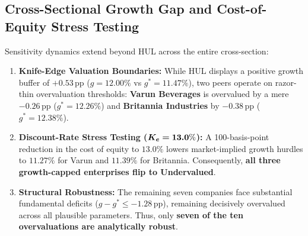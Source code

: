 \subsection{Cross-Sectional Growth Gap and Cost-of-Equity Stress Testing}
Sensitivity dynamics extend beyond HUL across the entire cross-section:
\begin{enumerate}[label=\textbf{\arabic*.}, topsep=2pt, itemsep=1.5pt, parsep=0pt]
    \item \textbf{Knife-Edge Valuation Boundaries:} While HUL displays a positive growth buffer of \textbf{$+0.53\,\text{pp}$} ($g = 12.00\%$ vs $g^* = 11.47\%$), two peers operate on razor-thin overvaluation thresholds: \textbf{Varun Beverages} is overvalued by a mere \textbf{$-0.26\,\text{pp}$} ($g^* = 12.26\%$) and \textbf{Britannia Industries} by \textbf{$-0.38\,\text{pp}$} ($g^* = 12.38\%$).
    \item \textbf{Discount-Rate Stress Testing ($\bm{K_e = 13.0\%}$):} A 100-basis-point reduction in the cost of equity to $13.0\%$ lowers market-implied growth hurdles to $11.27\%$ for Varun and $11.39\%$ for Britannia. Consequently, \textbf{all three growth-capped enterprises flip to Undervalued}.
    \item \textbf{Structural Robustness:} The remaining seven companies face substantial fundamental deficits ($g - g^* \le -1.28\,\text{pp}$), remaining decisively overvalued across all plausible parameters. Thus, only \textbf{seven of the ten overvaluations are analytically robust}.
\end{enumerate}
